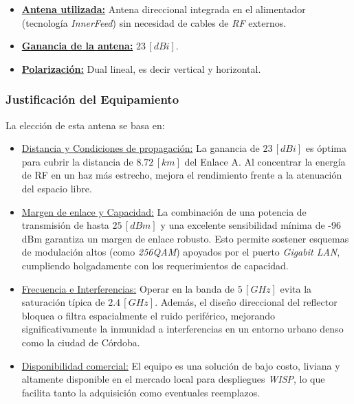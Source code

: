 \begin{itemize}
    \item \textbf{\underline{Antena utilizada:}} Antena direccional integrada en el alimentador (tecnología \textit{InnerFeed}) sin necesidad de cables de \textit{RF} externos.
    \item \textbf{\underline{Ganancia de la antena:}} $23 \, [dBi]$.
    \item \textbf{\underline{Polarización:}} Dual lineal, es decir vertical y horizontal.
\end{itemize}

\subsubsection{Justificación del Equipamiento}
\label{sec_2.8.1}
La elección de esta antena se basa en:
\begin{itemize}
    \item \underline{Distancia y Condiciones de propagación:} La ganancia de $23 \, [dBi]$ es óptima para cubrir la distancia de $8.72 \, [km]$ del Enlace A. Al concentrar la energía de RF en un haz más estrecho, mejora el rendimiento frente a la atenuación del espacio libre.
    \item \underline{Margen de enlace y Capacidad:} La combinación de una potencia de transmisión de hasta $25 \, [dBm]$ y una excelente sensibilidad mínima de -96 dBm garantiza un margen de enlace robusto. Esto permite sostener esquemas de modulación altos (como \textit{256QAM}) apoyados por el puerto \textit{Gigabit LAN}, cumpliendo holgadamente con los requerimientos de capacidad.
    \item \underline{Frecuencia e Interferencias:} Operar en la banda de $5 \, [GHz]$ evita la saturación típica de $2.4 \, [GHz]$. Además, el diseño direccional del reflector bloquea o filtra espacialmente el ruido periférico, mejorando significativamente la inmunidad a interferencias en un entorno urbano denso como la ciudad de Córdoba.
    \item \underline{Disponibilidad comercial:} El equipo es una solución de bajo costo, liviana y altamente disponible en el mercado local para despliegues \textit{WISP}, lo que facilita tanto la adquisición como eventuales reemplazos.
\end{itemize}



